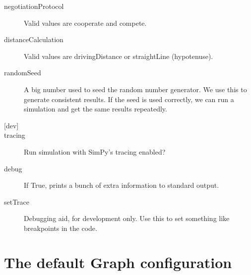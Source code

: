 \documentclass[11pt,letterpaper,onecolumn,twoside,openright,final]{report}
\begin{document}
\begin{description}
\item[negotiationProtocol]Valid values are cooperate and compete.

\item[distanceCalculation]
Valid values are drivingDistance or straightLine (hypotenuse).

\item[randomSeed]A big number used to seed the random number generator.
We use this to generate consistent results.
If the seed is used correctly, we can run a simulation and get the same results repeatedly.

\vspace{0.5cm}
\item[{[dev]}]

\item[tracing]Run simulation with SimPy's tracing enabled?

\item[debug]If True, prints a bunch of extra information to standard output.

\item[setTrace]Debugging aid, for development only.
Use this to set something like breakpoints in the code.
\end{description}


\section{The default Graph configuration}
\end{document}
